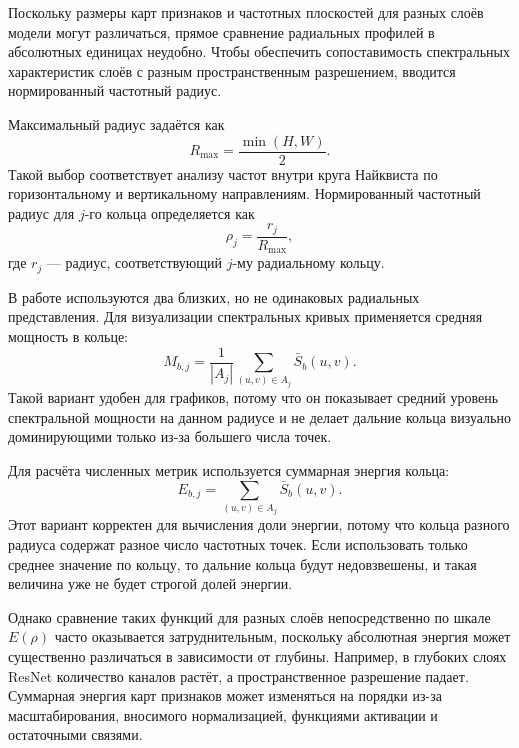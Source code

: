 Поскольку размеры карт признаков и частотных плоскостей для разных слоёв модели могут различаться, прямое сравнение радиальных профилей в абсолютных единицах неудобно. Чтобы обеспечить сопоставимость спектральных характеристик слоёв с разным пространственным разрешением, вводится нормированный частотный радиус.

Максимальный радиус задаётся как
\begin{equation}
R_{\max} = \frac{\min(H,W)}{2}.
\end{equation}
Такой выбор соответствует анализу частот внутри круга Найквиста по горизонтальному и вертикальному направлениям. Нормированный частотный радиус для $j$-го кольца определяется как
\begin{equation}
\rho_j = \frac{r_j}{R_{\max}},
\end{equation}
где $r_j$ — радиус, соответствующий $j$-му радиальному кольцу.

В работе используются два близких, но не одинаковых радиальных представления. Для визуализации спектральных кривых применяется средняя мощность в кольце:
\begin{equation}
M_{b,j} = \frac{1}{|A_j|}\sum_{(u,v)\in A_j}\bar{S}_{b}(u,v).
\end{equation}
Такой вариант удобен для графиков, потому что он показывает средний уровень спектральной мощности на данном радиусе и не делает дальние кольца визуально доминирующими только из-за большего числа точек.

Для расчёта численных метрик используется суммарная энергия кольца:
\begin{equation}
E_{b,j} = \sum_{(u,v)\in A_j}\bar{S}_{b}(u,v).
\end{equation}
Этот вариант корректен для вычисления доли энергии, потому что кольца разного радиуса содержат разное число частотных точек. Если использовать только среднее значение по кольцу, то дальние кольца будут недовзвешены, и такая величина уже не будет строгой долей энергии.

Однако сравнение таких функций для разных слоёв непосредственно по шкале $E(\rho)$ часто оказывается затруднительным, поскольку абсолютная энергия может существенно различаться в зависимости от глубины. Например, в глубоких слоях ResNet количество каналов растёт, а пространственное разрешение падает. Суммарная энергия карт признаков может изменяться на порядки из-за масштабирования, вносимого нормализацией, функциями активации и остаточными связями.

